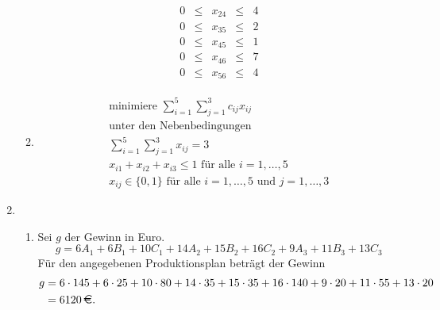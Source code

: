 \documentclass[a4paper]{scrartcl}
\begin{document}
\begin{enumerate}[label=\bfseries\arabic*.]
\begin{enumerate}
\begin{equation}
\begin{gathered}
\begin{array}{rcrcr}
                            0 & \leq & x_{24} & \leq & 4 \\
                            0 & \leq & x_{35} & \leq & 2 \\
                            0 & \leq & x_{45} & \leq & 1 \\
                            0 & \leq & x_{46} & \leq & 7 \\
                            0 & \leq & x_{56} & \leq & 4
                        \end{array}
                    \end{gathered}
                \end{equation}

            \item
                \begin{equation}
                    \begin{gathered}
                        \text{minimiere } \sum_{i=1}^5 \sum_{j=1}^3 c_{ij}x_{ij} \\
                        \text{unter den Nebenbedingungen} \\
                        \sum_{i=1}^5 \sum_{j=1}^3 x_{ij} = 3 \\
                        x_{i1} +x_{i2} +x_{i3} \leq 1 \text{ für alle } i = 1, \dots, 5 \\
                        x_{ij} \in \{ 0, 1 \} \text{ für alle } i = 1, \dots, 5 \text{ und } j = 1, \dots, 3
                    \end{gathered}
                \end{equation}
                

        \end{enumerate}

    \item %
        \begin{enumerate}
            \item Sei $g$ der Gewinn in Euro.
                \begin{equation}
                    g = 6A_1 +6B_1 +10C_1 +14A_2 +15B_2 +16C_2 +9A_3 +11B_3 +13C_3
                \end{equation}
                Für den angegebenen Produktionsplan beträgt der Gewinn
                \begin{equation}
                    \begin{split}
                        g &= 6 \cdot 145 +6 \cdot 25 +10 \cdot 80 +14 \cdot 35 +15 \cdot 35 +16 \cdot 140 +9 \cdot 20 +11 \cdot 55 +13 \cdot 20 \\
                        &= 6120 \text{\,\EUR.}
                    \end{split}
                \end{equation}


\end{enumerate}
\end{enumerate}
\end{document}
